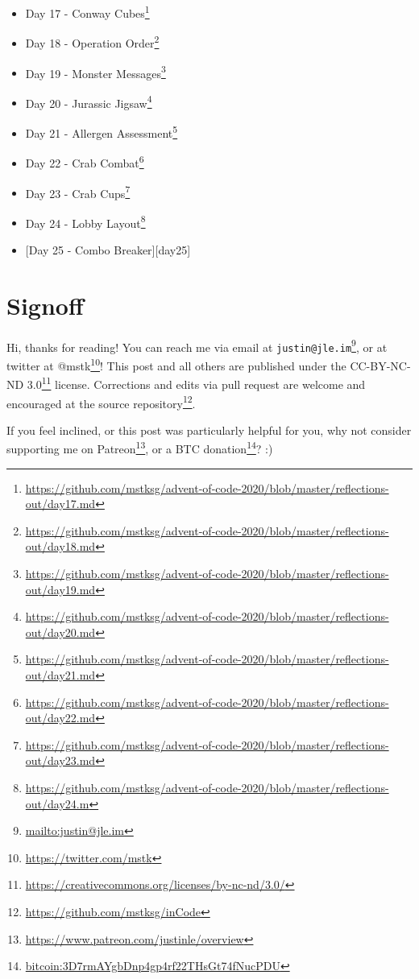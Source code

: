 \documentclass[]{article}
\renewcommand{\href}[2]{#2\footnote{\url{#1}}}
\begin{document}
\begin{itemize}
  \href{https://github.com/mstksg/advent-of-code-2020/blob/master/reflections-out/day16.md}{Day
  16 - Ticket Translation}
\item
  \href{https://github.com/mstksg/advent-of-code-2020/blob/master/reflections-out/day17.md}{Day
  17 - Conway Cubes}
\item
  \href{https://github.com/mstksg/advent-of-code-2020/blob/master/reflections-out/day18.md}{Day
  18 - Operation Order}
\item
  \href{https://github.com/mstksg/advent-of-code-2020/blob/master/reflections-out/day19.md}{Day
  19 - Monster Messages}
\item
  \href{https://github.com/mstksg/advent-of-code-2020/blob/master/reflections-out/day20.md}{Day
  20 - Jurassic Jigsaw}
\item
  \href{https://github.com/mstksg/advent-of-code-2020/blob/master/reflections-out/day21.md}{Day
  21 - Allergen Assessment}
\item
  \href{https://github.com/mstksg/advent-of-code-2020/blob/master/reflections-out/day22.md}{Day
  22 - Crab Combat}
\item
  \href{https://github.com/mstksg/advent-of-code-2020/blob/master/reflections-out/day23.md}{Day
  23 - Crab Cups}
\item
  \href{https://github.com/mstksg/advent-of-code-2020/blob/master/reflections-out/day24.m}{Day
  24 - Lobby Layout}
\item
  {[}Day 25 - Combo Breaker{]}{[}day25{]}
\end{itemize}

\hypertarget{signoff}{%
\section{Signoff}\label{signoff}}

Hi, thanks for reading! You can reach me via email at
\href{mailto:justin@jle.im}{\nolinkurl{justin@jle.im}}, or at twitter at
\href{https://twitter.com/mstk}{@mstk}! This post and all others are published
under the \href{https://creativecommons.org/licenses/by-nc-nd/3.0/}{CC-BY-NC-ND
3.0} license. Corrections and edits via pull request are welcome and encouraged
at \href{https://github.com/mstksg/inCode}{the source repository}.

If you feel inclined, or this post was particularly helpful for you, why not
consider \href{https://www.patreon.com/justinle/overview}{supporting me on
Patreon}, or a \href{bitcoin:3D7rmAYgbDnp4gp4rf22THsGt74fNucPDU}{BTC donation}?
:)
\end{document}
